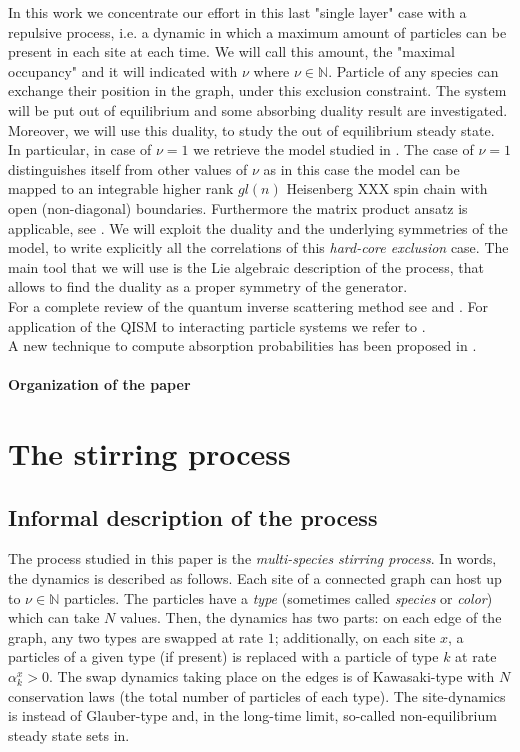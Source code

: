 \documentclass[10pt]{article}
\numberwithin{equation}{section}
\numberwithin{equation}{subsection}
\newcommand{\twoj}{\nu}
\begin{document}
In this work we concentrate our effort in this last "single layer" case with a repulsive process, i.e. a dynamic in which a maximum amount of particles can be present in each site at each time. We will call this amount, the "maximal occupancy" and it will indicated with $\twoj$ where $\twoj\in\mathbb{N}$. Particle of any species can exchange their position in the graph, under this exclusion constraint. The system will be put out of equilibrium and some absorbing duality result are investigated. Moreover, we will use this duality, to study the out of equilibrium steady state. In particular, in case of $\twoj=1$ we retrieve the model studied in \cite{vanicat2017exact}. 
{\color{red}
The case of $\twoj=1$ distinguishes itself from other values of $\twoj$ as in this case the model can be mapped to an integrable higher rank $gl(n)$ Heisenberg XXX spin chain with open (non-diagonal) boundaries. Furthermore the matrix product ansatz \cite{derrida1993exact}  is applicable, see \cite{Crampe:2014aoa,vanicat2017exact}.
}
We will exploit the duality and the underlying symmetries of the model, to write explicitly all the correlations of this \textit{hard-core exclusion} case. The main tool that we will use is the Lie algebraic description of the process, that allows to find the duality as a proper symmetry of the generator. \\
 For a complete review of the quantum inverse scattering method see \cite{Sklyanin:1988yz} and \cite{faddeev1996algebraic}. For application of the QISM to interacting particle systems we refer to \cite{frassek2020eigenstates,frassek2019non,frassek2022exact,vanicat2017exact}. \\
 A new technique to compute absorption probabilities has been proposed in \cite{floreani2023non}.
\paragraph{Organization of the paper}
\section{The stirring process}
\subsection{Informal description of the process}
The process studied in this paper is the {\em multi-species stirring process}. 
In words, the dynamics is described as follows. Each site
of a connected graph can host up to $\nu\in \mathbb{N}$ particles.
The particles have a {\em type} (sometimes called {\em species} or {\em color})
which can take $N$ values.
Then, the dynamics has two parts: on each edge of the graph, 
any two types are swapped at rate $1$; additionally, on each site $x$, 
a particles of a given type (if present) is replaced with a
particle of type $k$ at rate $\alpha_k^x >0$.
The swap dynamics taking place on the edges is of Kawasaki-type 
with $N$ conservation laws
(the total number of particles of each type). 
The site-dynamics is instead of Glauber-type 
and, in the long-time limit, so-called non-equilibrium
steady state sets in.
\end{document}
